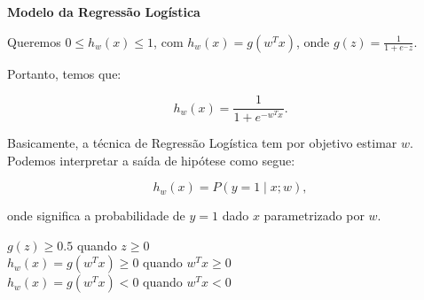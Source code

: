 \textbf{Modelo da Regressão Logística}\\

\begin{center}
\end{center}
 
Queremos $0 \leq h_w(x) \leq 1$, com $h_w(x) = g(w^Tx)$, onde $g(z) = \frac{1}{1 + e^-z}$.
 
Portanto, temos que:

\begin{equation}
h_w(x) = \frac{1}{1 + e^{-w^Tx}}. 	
\end{equation}

Basicamente, a técnica de Regressão Logística tem por objetivo estimar $w$. Podemos interpretar a saída de hipótese como segue:

\begin{equation}
h_w(x) = P(y = 1 \mid x; w),
\end{equation}

onde significa a probabilidade de $y = 1$ dado $x$ parametrizado por $w$.

\begin{center}
\end{center}

\begin{center}
$g(z) \geq 0.5$ quando $z \geq 0$\\
$h_w(x) = g(w^Tx) \geq 0$ quando $w^Tx \geq 0$\\
$h_w(x) = g(w^Tx) < 0$ quando $w^Tx < 0$\\	
\end{center}

